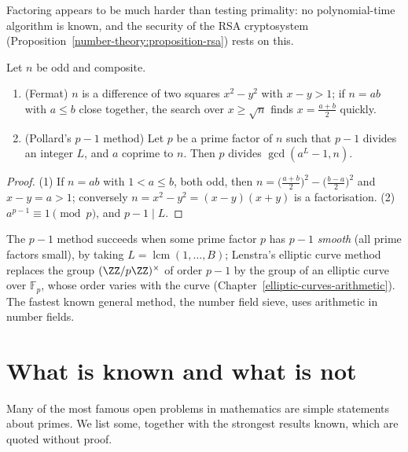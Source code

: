 Factoring appears to be much harder than testing primality: no polynomial-time algorithm is known, and the security of the RSA cryptosystem (Proposition~\ref{number-theory:proposition-rsa})
rests on this.

\begin{proposition}\label{prime-numbers:proposition-factoring-methods}
Let $n$ be odd and composite.
\begin{enumerate}
\item (Fermat) $n$ is a difference of two squares $x^2 - y^2$ with $x - y > 1$; if $n = ab$ with $a \leq b$ close together, the search over $x \geq \sqrt{n}$ finds $x = \frac{a + b}{2}$ quickly.
\item (Pollard's $p - 1$ method) Let $p$ be a prime factor of $n$ such that $p - 1$ divides an integer $L$, and $a$ coprime to $n$. Then $p$ divides $\gcd(a^L - 1, n)$.
\end{enumerate}
\end{proposition}

\begin{proof}
(1) If $n = ab$ with $1 < a \leq b$, both odd, then $n = \bigl(\frac{a + b}{2}\bigr)^2 - \bigl(\frac{b - a}{2}\bigr)^2$ and $x - y = a > 1$; conversely $n = x^2 - y^2 = (x - y)(x + y)$ is a factorisation.
(2) $a^{p-1} \equiv 1 \pmod p$, and $p - 1 \mid L$.
\end{proof}

The $p - 1$ method succeeds when some prime factor $p$ has $p - 1$ \emph{smooth} (all prime factors small), by taking $L = \operatorname{lcm}(1, \ldots, B)$; Lenstra's elliptic curve method replaces the
group $(\ZZ/p\ZZ)^\times$ of order $p - 1$ by the group of an elliptic curve over $\mathbb{F}_p$, whose order varies with the curve (Chapter~\ref{elliptic-curves-arithmetic}). The fastest known general method,
the number field sieve, uses arithmetic in number fields.

\section{What is known and what is not}\label{prime-numbers:section-open}

Many of the most famous open problems in mathematics are simple statements about primes. We list some, together with the strongest results known, which are quoted without proof.

